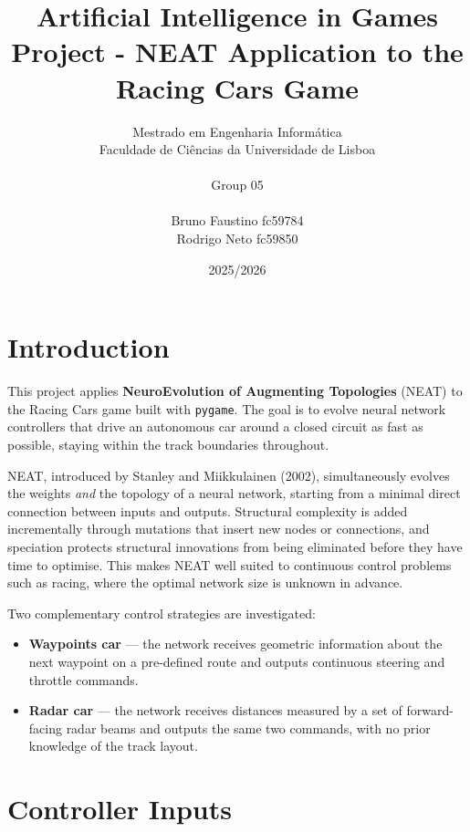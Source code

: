 \documentclass[a4paper]{article}
\title{
    \color{mauve}Artificial Intelligence in Games\\[1ex]
    Project - NEAT Application to the Racing Cars Game\\[1ex]
}
\author{
    Mestrado em Engenharia Informática\\
    Faculdade de Ciências da Universidade de Lisboa\\ \\
    Group 05\\ \\
    Bruno Faustino fc59784\\
    Rodrigo Neto fc59850
}
\date{2025/2026}
\begin{document}
\maketitle
\raggedright
\thispagestyle{empty}

\section{Introduction}
\label{sec:introduction}

This project applies \textbf{NeuroEvolution of Augmenting Topologies} (NEAT) to the
Racing Cars game built with \texttt{pygame}.
The goal is to evolve neural network controllers that drive an autonomous car around a
closed circuit as fast as possible, staying within the track boundaries throughout.

NEAT, introduced by Stanley and Miikkulainen (2002), simultaneously evolves the weights
\emph{and} the topology of a neural network, starting from a minimal direct connection
between inputs and outputs.
Structural complexity is added incrementally through mutations that insert new nodes or
connections, and speciation protects structural innovations from being eliminated before
they have time to optimise.
This makes NEAT well suited to continuous control problems such as racing, where the
optimal network size is unknown in advance.

Two complementary control strategies are investigated:

\begin{itemize}
    \item \textbf{Waypoints car} --- the network receives geometric information about
    the next waypoint on a pre-defined route and outputs continuous steering and
    throttle commands.
    \item \textbf{Radar car} --- the network receives distances measured by a set of
    forward-facing radar beams and outputs the same two commands, with no prior
    knowledge of the track layout.
\end{itemize}

\section{Controller Inputs}
\label{sec:controller-inputs}


\end{document}
